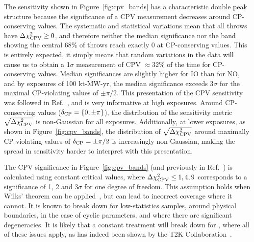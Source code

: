 The sensitivity shown in Figure~\ref{fig:cpv_bands} has a characteristic double peak structure because the significance of a CPV measurement decreases around CP-conserving values. The systematic and statistical variations mean that all throws have $\Delta\chi^{2}_{\mathrm{CPV}} \geq 0$, and therefore neither the median significance nor the band showing the central 68\% of throws reach exactly 0 at CP-conserving values. This is entirely expected, it simply means that random variations in the data will cause us to obtain a 1$\sigma$ measurement of CPV $\approx$32\% of the time for CP-conserving values. Median significances are slightly higher for IO than for NO, and by exposures of 100 kt-MW-yr, the median significance exceeds 3$\sigma$ for the maximal CP-violating values of $\pm\pi/2$. This presentation of the CPV sensitivity was followed in Ref.~\cite{Abi:2020qib}, and is very informative at high exposures. Around CP-conserving values ($\delta_{\rm CP} = \{0,\pm\pi\}$), the distribution of the sensitivity metric $\sqrt{\Delta\chi^{2}_{\mathrm{CPV}}}$ is non-Gaussian for all exposures. Additionally, at lower exposures, as shown in Figure~\ref{fig:cpv_bands}, the distribution of $\sqrt{\Delta\chi^{2}_{\mathrm{CPV}}}$ around maximally CP-violating values of $\delta_{\rm CP} = \pm\pi/2$ is increasingly non-Gaussian, making the spread in sensitivity harder to interpret with this presentation.

The CPV significance in Figure~\ref{fig:cpv_bands} (and previously in Ref.~\cite{Abi:2020qib}) is calculated using constant \dchisq critical values, where $\Delta\chi^{2}_{\mathrm{CPV}} \leq 1, 4, 9$ corresponds to a significance of 1, 2 and 3$\sigma$ for one degree of freedom. This assumption holds when Wilks' theorem can be applied~\cite{wilks}, but can lead to incorrect coverage where it cannot. It is known to break down for low-statistics samples, around physical boundaries, in the case of cyclic parameters, and where there are significant degeneracies. It is likely that a constant \dchisq treatment will break down for \deltacp, where all of these issues apply, as has indeed been shown by the T2K Collaboration~\cite{Abe:2021gky}.

